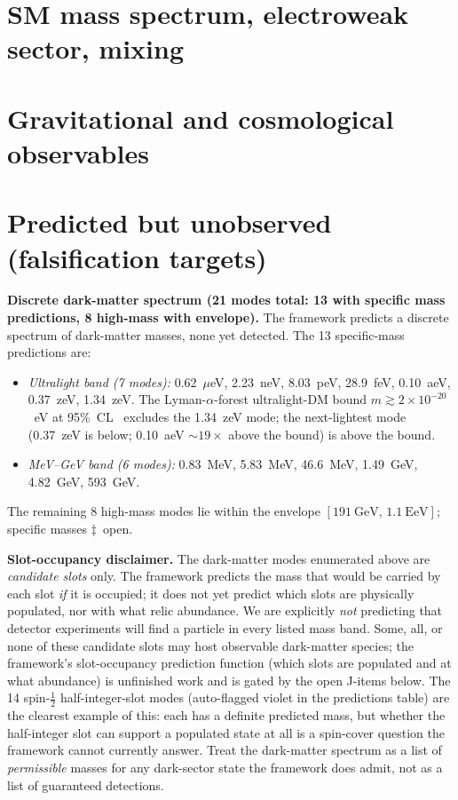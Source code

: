 \documentclass[reprint,amsmath,amssymb,aps,prd,longbibliography,floatfix]{revtex4-2}
\begin{document}
\section{SM mass spectrum, electroweak sector, mixing}

\begin{widetext}

\end{widetext}

\section{Gravitational and cosmological observables}

\begin{widetext}

\end{widetext}

\section{Predicted but unobserved (falsification targets)}

\noindent\textbf{Discrete dark-matter spectrum (21 modes total: 13
with specific mass predictions, 8 high-mass with envelope).}
The framework predicts a discrete spectrum of dark-matter masses,
none yet detected. The 13 specific-mass predictions are:
\begin{itemize}\itemsep0pt
\item \emph{Ultralight band (7 modes):} 0.62~$\mu$eV, 2.23~neV,
8.03~peV, 28.9~feV, 0.10~aeV, 0.37~zeV, 1.34~zeV. The
Lyman-$\alpha$-forest ultralight-DM bound $m \gtrsim 2\times
10^{-20}$~eV at 95\%~CL~\cite{RogersPeiris2021} excludes the
1.34~zeV mode; the next-lightest mode (0.37~zeV is below; 0.10~aeV
$\sim 19\times$ above the bound) is above the bound.
\item \emph{MeV--GeV band (6 modes):} 0.83~MeV, 5.83~MeV,
46.6~MeV, 1.49~GeV, 4.82~GeV, 593~GeV.
\end{itemize}
The remaining 8 high-mass modes lie within the envelope
$[191~\mathrm{GeV},\,1.1~\mathrm{EeV}]$; specific masses
$\ddagger$~open.

\noindent\textbf{Slot-occupancy disclaimer.}
The dark-matter modes enumerated above are \emph{candidate slots}
only. The framework predicts the mass that would be carried by
each slot \emph{if} it is occupied; it does not yet predict which
slots are physically populated, nor with what relic abundance. We
are explicitly \emph{not} predicting that detector experiments will
find a particle in every listed mass band. Some, all, or none of
these candidate slots may host observable dark-matter species; the
framework's slot-occupancy prediction function (which slots are
populated and at what abundance) is unfinished work and is gated
by the open J-items below. The 14 spin-$\tfrac12$ half-integer-slot
modes (auto-flagged violet in the predictions table) are the
clearest example of this: each has a definite predicted mass, but
whether the half-integer slot can support a populated state at all
is a spin-cover question the framework cannot currently answer.
Treat the dark-matter spectrum as a list of \emph{permissible}
masses for any dark-sector state the framework does admit, not as
a list of guaranteed detections.
\end{document}
